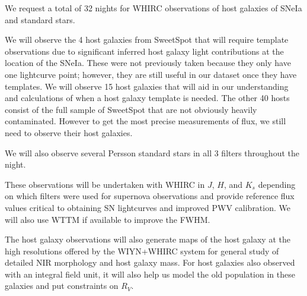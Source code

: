 \documentclass[11pt]{article}
\begin{document}
\clearpage


%

%

\expdesign

We request a total of 32 nights for WHIRC observations of host galaxies of SNeIa and standard stars.  

We will observe the 4 host galaxies from SweetSpot that will
require template observations due to significant inferred host galaxy light contributions at the location of the SNeIa.
These were not previously taken because they only have one lightcurve point; however, they are still useful in our dataset once they have templates.
We will observe 15 host galaxies that will aid in our understanding and calculations of when a host galaxy template is needed. 
The other 40 hosts consist of the full sample of SweetSpot that are not obviously heavily contaminated. 
However to get the most precise measurements of flux, we still need to observe their host galaxies.  

We will also observe several Persson standard stars in all 3 filters throughout the night.

These observations will be undertaken with WHIRC in $J$, $H$, and $K_s$ depending on which filters were used for supernova observations
and provide reference flux values critical to obtaining
SN lightcurves and improved PWV calibration.  
We will also use WTTM if available to improve the FWHM.

The host galaxy observations will also generate
maps of the host galaxy at the high resolutions offered by the WIYN+WHIRC system for general study of detailed NIR morphology and host galaxy mass.
For host galaxies also observed with an integral field unit, it will also help us model the old population in these galaxies and put constraints on $R_V$. 

% 
\end{document}

